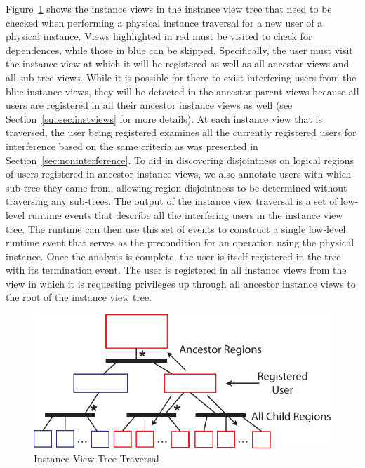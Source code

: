 Figure~\ref{fig:instrav} shows the instance views 
in the instance view tree that need to be checked 
when performing a physical instance traversal for a 
new user of a physical instance. Views highlighted 
in red must be visited to check for dependences, while 
those in blue can be skipped. Specifically, the 
user must visit the instance view at which it will be 
registered as well as all ancestor views and all
sub-tree views. While it is possible for there to 
exist interfering users from the blue instance views,
they will be detected in the ancestor parent views
because all users are registered in all their ancestor
instance views as well (see Section~\ref{subsec:instviews}
for more details). At each instance view that is
traversed, the user being registered examines all 
the currently registered users for interference
based on the same criteria as was presented in
Section~\ref{sec:noninterference}. To aid in 
discovering disjointness on logical regions
of users registered in ancestor instance views,
we also annotate users with which sub-tree they
came from, allowing region disjointness to be
determined without traversing any sub-trees.
The output of the instance view traversal is a
set of low-level runtime events that describe
all the interfering users in the instance view
tree. The runtime can then use this set of events
to construct a single low-level runtime event
that serves as the precondition for an operation
using the physical instance. Once the
analysis is complete, the user is itself registered
in the tree with its termination event. The user
is registered in all instance views from the view
in which it is requesting privileges up through all ancestor
instance views to the root of the instance view tree.

\begin{figure}[t]
\centering
\includegraphics[scale=0.9]{figs/InstanceViewTraversal.pdf}
\caption{Instance View Tree Traversal\label{fig:instrav}}
\end{figure}

